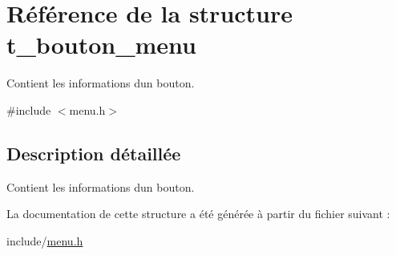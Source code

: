 \hypertarget{structt__bouton__menu}{}\section{Référence de la structure t\+\_\+bouton\+\_\+menu}
\label{structt__bouton__menu}


Contient les informations d\textquotesingle{}un bouton.  




{\ttfamily \#include $<$menu.\+h$>$}



\subsection{Description détaillée}
Contient les informations d\textquotesingle{}un bouton. 

La documentation de cette structure a été générée à partir du fichier suivant \+:\begin{DoxyCompactItemize}
\item 
include/\hyperlink{menu_8h}{menu.\+h}\end{DoxyCompactItemize}
